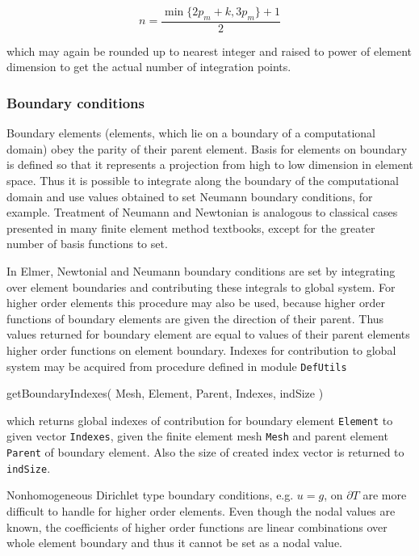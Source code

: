 \begin{equation}
n=\frac{\min{\{2p_m+k,3p_m\}}+1}{2}
\end{equation}

\noindent which may again be rounded up to nearest integer and raised to power of element dimension to get the actual number of integration points. 

\subsubsection{Boundary conditions}

Boundary elements (elements, which lie on a boundary of a computational domain) obey the parity of their parent element. Basis for elements on boundary is defined so that it represents a projection from high to low dimension in element space. Thus it is possible to integrate along the boundary of the computational domain and use values obtained to set Neumann boundary conditions, for example. Treatment of Neumann and Newtonian is analogous to classical cases presented in many finite element method textbooks, except for the greater number of basis functions to set. 

In Elmer, Newtonial and Neumann boundary conditions are set by integrating over element boundaries and contributing these integrals to global system. For higher order elements this procedure may also be used, because higher order functions of boundary elements are given the direction of their parent. Thus values returned for boundary element are equal to values of their parent elements higher order functions on element boundary. Indexes for contribution to global system may be acquired from procedure defined in module \texttt{DefUtils}

\ttbegin
getBoundaryIndexes( Mesh, Element, Parent, Indexes, indSize )
\ttend

\noindent which returns global indexes of contribution for boundary element \texttt{Element} to given vector \texttt{Indexes}, given the finite element mesh \texttt{Mesh} and parent element \texttt{Parent} of boundary element. Also the size of created index vector is returned to \texttt{indSize}. 

Nonhomogeneous Dirichlet type boundary conditions, e.g. $u=g$, on $\partial T$ are more difficult to handle for higher order elements. Even though the nodal values are known, the coefficients of higher order functions are linear combinations over whole element boundary and thus it cannot be set as a nodal value.

